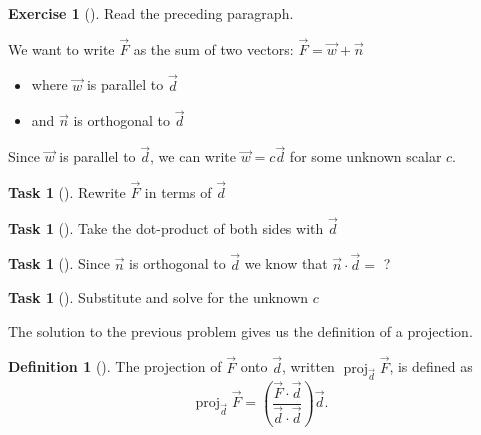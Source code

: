 \documentclass[10pt,]{book}
\theoremstyle{plain}
\theoremstyle{definition}
\newtheorem{definition}[theorem]{Definition}
\theoremstyle{definition}
\theoremstyle{definition}
\theoremstyle{definition}
\newtheorem{exploration}[project]{Exercise}
\newtheorem{task}[project]{Task}
\theoremstyle{definition}
\numberwithin{equation}{section}
\DeclareMathOperator{\proj}{proj}
\begin{document}
\begin{exploration}[]\label{prob_force_intro}
Read the preceding paragraph.%
\par
We want to write \(\vec F\) as the sum of two vectors: \(\vec F = \vec w+\vec n\) \leavevmode%
\begin{itemize}[label=\textbullet]
\item{}where \(\vec w\) is parallel to \(\vec d\)%
\item{}and \(\vec n\) is orthogonal to \(\vec d\)%
\end{itemize}
%
\par
Since \(\vec w\) is parallel to \(\vec d\), we can write \(\vec w=c\vec d\) for some unknown scalar \(c\).%
\begin{task}[]\label{task-83}
Rewrite \(\vec F\) in terms of \(\vec d\)%
\end{task}
\begin{task}[]\label{task-84}
Take the dot-product of both sides with \(\vec d\)%
\end{task}
\begin{task}[]\label{task-85}
Since \(\vec n\) is orthogonal to \(\vec d\) we know that \(\vec n \cdot \vec d =\) ?%
\end{task}
\begin{task}[]\label{task-86}
Substitute and solve for the unknown \(c\)%
\end{task}
\end{exploration}
The solution to the previous problem gives us the definition of a projection.%
\begin{definition}[{}]\label{definition-11}
The projection of \(\vec F\) onto \(\vec d\), written \(\proj_{\vec d}\vec F\), is defined as%
\begin{equation*}
\proj_{\vec d}\vec F = \left(\frac{\vec F\cdot \vec d}{\vec d\cdot \vec d}\right)\vec d.
\end{equation*}
%
\end{definition}
\typeout{************************************************}
\typeout{************************************************}
\end{document}
